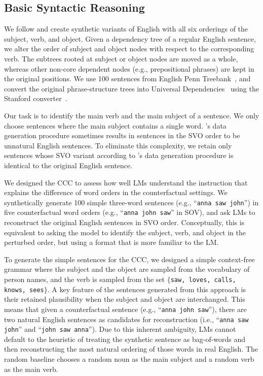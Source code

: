 \subsection{Basic Syntactic Reasoning}

We follow \citet{ravfogel2019studying} and create synthetic variants of English with all six orderings of the subject, verb, and object. 
Given a dependency tree of a regular English sentence, we alter the order of subject and object nodes with respect to the corresponding verb. The subtrees rooted at subject or object nodes are moved as a whole, whereas other non-core dependent nodes (e.g., prepositional phrases) are kept in the original positions. We use 100 sentences from English Penn Treebank~\cite{marcus1993building}, and convert the original phrase-structure trees into Universal Dependencies~\cite{nivre2016universal} using the Stanford converter~\cite{schuster2016enhanced}. 

Our task is to identify the main verb and the main subject of a sentence. We only choose sentences where the main subject contains a single word. 
\citet{ravfogel2019studying}'s data generation procedure sometimes results in sentences in the SVO order to be unnatural English sentences. To eliminate this complexity, we retain only sentences whose SVO variant according to \citet{ravfogel2019studying}'s data generation procedure is identical to the original English sentence.

We designed the CCC to assess how well LMs understand the instruction that explains the difference of word orders in the counterfactual settings. We synthetically generate 100 simple three-word sentences (e.g., ``\texttt{anna saw john}'') in five counterfactual word orders (e.g., ``\texttt{anna john saw}'' in SOV), and ask LMs to reconstruct the original English sentences in SVO order. Conceptually, this is equivalent to asking the model to identify the subject, verb, and object in the perturbed order, but using a format that is more familiar to the LM. %

To generate the simple sentences for the CCC, we designed a simple context-free grammar where the subject and the object are sampled from the vocabulary of person names, and the verb is sampled from the set $\{$\texttt{saw, loves, calls, knows, sees}$\}$. A key feature of the sentences generated from this approach is their retained plausibility when the subject and object are interchanged. This means that given a counterfactual sentence (e.g., ``\texttt{anna john saw}''), there are two natural English sentences as candidates for reconstruction (i.e., ``\texttt{anna saw john}'' and ``\texttt{john saw anna}'').  Due to this inherent ambiguity,  LMs cannot default to the heuristic of treating the synthetic sentence as bag-of-words and then reconstructing the most natural ordering of those words in real English.
The random baseline chooses a random noun as the main subject and a random verb as the main verb.

